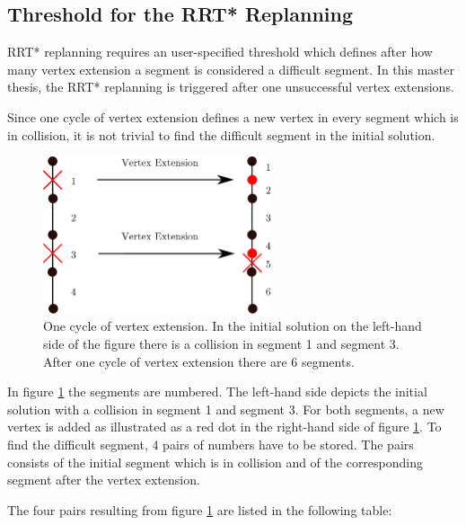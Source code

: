 \subsection{Threshold for the RRT* Replanning}\label{sec:RRTreplanning}

RRT* replanning requires an user-specified threshold which defines after how many vertex extension a segment is considered a difficult segment. In this master thesis, the RRT* replanning is triggered after one unsuccessful vertex extensions.\newline

Since one cycle of vertex extension defines a new vertex in every segment which is in collision, it is not trivial to find the difficult segment in the initial solution.

\begin{figure}[H]
   \centering
   \includegraphics[width=0.6\textwidth]{pics/recogniseSegment.eps}
   \caption{One cycle of vertex extension. In the initial solution on the left-hand side of the figure there is a collision in segment 1 and segment 3. After one cycle of vertex extension there are 6 segments. }
   \label{pic:recognise}
\end{figure}

In figure \ref{pic:recognise} the segments are numbered. The left-hand side depicts the initial solution with a collision in segment 1 and segment 3. For both segments, a new vertex is added as illustrated as a red dot in the right-hand side of figure \ref{pic:recognise}. To find the difficult segment, 4 pairs of numbers have to be stored. The pairs consists of the initial segment which is in collision and of the corresponding segment after the vertex extension. \newline

The four pairs resulting from figure \ref{pic:recognise} are listed in the following table:

